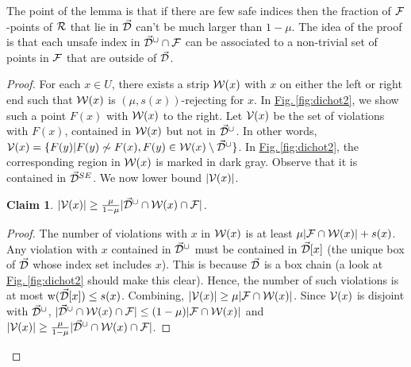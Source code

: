 \documentclass{acmsmall}
\newtheorem{claim}[theorem]{Claim}
\newcommand{\cD}{{\cal D}}
\newcommand{\cF}{{\cal F}}
\newcommand{\cR}{{\cal R}}
\newcommand{\cV}{{\cal V}}
\newcommand{\cW}{{\cal W}}
\newcommand{\Fig}[1]{\hyperref[fig:#1]{Fig.\,\ref*{fig:#1}}} %
\newcommand{\width}{{\bf {\rm  w}}}
\begin{document}
The point of the lemma is that if there are few safe indices then the fraction of $\cF$-points of $\cR$ that 
lie in $\vec{\cD}$ can't be much larger than $1-\mu$.
The idea of the proof is that each unsafe index in $\vec{\cD}^{\cup} \cap \cF$ can be associated
to a non-trivial set of points in $\cF$ that are outside of $\vec{\cD}$.



\begin{proof} For each $x \in U$, there exists a strip $\cW(x)$ with $x$ on either 
the left or right end such that $\cW(x)$ is $(\mu,s(x))$-rejecting for $x$.  
In \Fig{dichot2}, we show such a point $F(x)$ with $\cW(x)$ to the right.
Let $\cV(x)$ be the set of violations with $F(x)$, contained in $\cW(x)$ but not in $\vec{\cD}^\cup$.
In other words, $\cV(x) = \{F(y) | F(y) \not\sim F(x), F(y) \in \cW(x) \setminus \vec{\cD}^\cup\}$.
In \Fig{dichot2}, the corresponding region in $\cW(x)$ is marked in dark gray. Observe
that it is contained in $\vec{\cD}^{SE}$. We now lower bound $|\cV(x)|$. 

\begin{claim} 
\label{clm:cV}
$|\cV(x)| \geq \frac{\mu}{1-\mu} |\vec{\cD}^{\cup} \cap \cW(x)\cap \cF|$.
\end{claim}

\begin{proof}
The number of violations with $x$ in $\cW(x)$ is at least $\mu|\cF \cap \cW(x)|+s(x)$.
Any violation with $x$ contained in $\vec{\cD}^\cup$ must be contained in $\vec{\cD}[x]$ (the unique box of $\vec{\cD}$ whose index set includes $x$).
This is because $\vec{\cD}$ is a box chain (a look at \Fig{dichot2} should make this clear). 
Hence, the number of such violations is at most $\width(\vec{\cD}[x]) \leq s(x)$.
Combining, $|\cV(x)| \geq \mu|\cF \cap \cW(x)|$. Since $\cV(x)$ is disjoint with $\vec{\cD}^\cup$,
$|\vec{\cD}^\cup \cap \cW(x)\cap \cF| \leq (1-\mu)|\cF \cap \cW(x)|$ and $|\cV(x)| \geq \frac{\mu}{1-\mu} |\vec{\cD}^{\cup} \cap \cW(x) \cap \cF|$.
\end{proof}
%
%
%


\end{proof}
\end{document}
